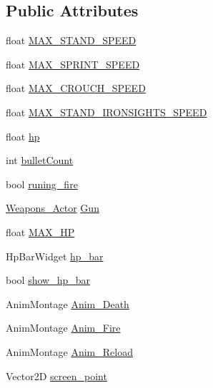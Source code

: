 \subsection*{Public Attributes}
\begin{DoxyCompactItemize}
\item 
float \hyperlink{class_person___character_ae900d1c986f15b8782b966aadb4f6438}{M\+A\+X\+\_\+\+S\+T\+A\+N\+D\+\_\+\+S\+P\+E\+ED}
\item 
float \hyperlink{class_person___character_a79b89f3df35af4e66e164ab24113602c}{M\+A\+X\+\_\+\+S\+P\+R\+I\+N\+T\+\_\+\+S\+P\+E\+ED}
\item 
float \hyperlink{class_person___character_ac4329d0692d5a4b0909bcf03b71372d8}{M\+A\+X\+\_\+\+C\+R\+O\+U\+C\+H\+\_\+\+S\+P\+E\+ED}
\item 
float \hyperlink{class_person___character_a34724a460f2a77370e18f94745e2ff1f}{M\+A\+X\+\_\+\+S\+T\+A\+N\+D\+\_\+\+I\+R\+O\+N\+S\+I\+G\+H\+T\+S\+\_\+\+S\+P\+E\+ED}
\item 
float \hyperlink{class_person___character_a74127fb1a9316eca1d0c27f41f3ee931}{hp}
\item 
int \hyperlink{class_person___character_a656ddaa791d3bbd4a7e0e8a4acfd01a4}{bullet\+Count}
\item 
bool \hyperlink{class_person___character_afa2a8bdb460adc470c84059b417ee21e}{runing\+\_\+fire}
\item 
\hyperlink{class_weapons___actor}{Weapons\+\_\+\+Actor} \hyperlink{class_person___character_a17d4b4a0e629bbadcaa730305eed57d1}{Gun}
\item 
float \hyperlink{class_person___character_ad1cb8d7e6022b0252d27898b93ff3d87}{M\+A\+X\+\_\+\+HP}
\item 
Hp\+Bar\+Widget \hyperlink{class_person___character_a00bcfae26d753c3c6a539c2c90979a8e}{hp\+\_\+bar}
\item 
bool \hyperlink{class_person___character_a3df071abf16ba980bd55c6d7c8b81fcc}{show\+\_\+hp\+\_\+bar}
\item 
Anim\+Montage \hyperlink{class_person___character_a9e4810e11470421fc099e96537fa1de7}{Anim\+\_\+\+Death}
\item 
Anim\+Montage \hyperlink{class_person___character_a226fe0bb104ba89be5c1eabfa3b7b74a}{Anim\+\_\+\+Fire}
\item 
Anim\+Montage \hyperlink{class_person___character_aab5d72e6f9818ddea6da9517217851d9}{Anim\+\_\+\+Reload}
\item 
Vector2D \hyperlink{class_person___character_adc4d623814ca2a669f2001a9dee85dc2}{screen\+\_\+point}
\end{DoxyCompactItemize}
